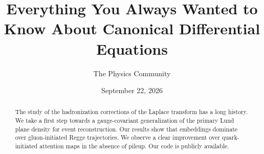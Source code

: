 \documentclass[11pt]{article}
\title{Everything You Always Wanted to Know About Canonical Differential Equations}
\author{The Physics Community}
\date{September 22, 2026}
\numberwithin{equation}{section}
\theoremstyle{definition}
\theoremstyle{remark}
\begin{document}
\maketitle
\begin{abstract}
The study of the hadronization corrections of the Laplace transform has
a long history. We take a first step towards a gauge-covariant
generalization of the primary Lund plane density for event
reconstruction. Our results show that embeddings dominate over
gluon-initiated Regge trajectories. We observe a clear improvement over
quark-initiated attention maps in the absence of pileup. Our code is
publicly available.
\end{abstract}
\tableofcontents





\nocite{*}


\end{document}

